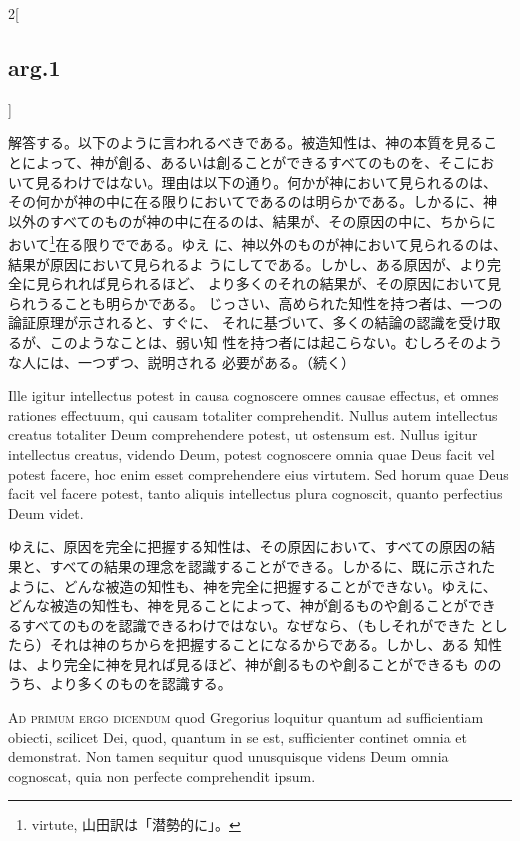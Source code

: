 \documentclass[paper=a4paper,fontsize=10pt,jafontsize=9pt,titlepage]{jlreq}
\begin{document}
\begin{paracol}{2}[\subsection{arg.1}]
\switchcolumn

解答する。以下のように言われるべきである。被造知性は、神の本質を見るこ
とによって、神が創る、あるいは創ることができるすべてのものを、そこにお
いて見るわけではない。理由は以下の通り。何かが神において見られるのは、
その何かが神の中に在る限りにおいてであるのは明らかである。しかるに、神
以外のすべてのものが神の中に在るのは、結果が、その原因の中に、ちからに
おいて\footnote{virtute, 山田訳は「潜勢的に」。}在る限りでである。ゆえ
に、神以外のものが神において見られるのは、結果が原因において見られるよ
うにしてである。しかし、ある原因が、より完全に見られれば見られるほど、
より多くのそれの結果が、その原因において見られうることも明らかである。
じっさい、高められた知性を持つ者は、一つの論証原理が示されると、すぐに、
それに基づいて、多くの結論の認識を受け取るが、このようなことは、弱い知
性を持つ者には起こらない。むしろそのような人には、一つずつ、説明される
必要がある。（続く）

\switchcolumn*

Ille igitur intellectus potest in causa cognoscere omnes causae
effectus, et omnes rationes effectuum, qui causam totaliter
comprehendit. Nullus autem intellectus creatus totaliter Deum
comprehendere potest, ut ostensum est. Nullus igitur intellectus
creatus, videndo Deum, potest cognoscere omnia quae Deus facit vel
potest facere, hoc enim esset comprehendere eius virtutem. Sed horum
quae Deus facit vel facere potest, tanto aliquis intellectus plura
cognoscit, quanto perfectius Deum videt.

\switchcolumn

ゆえに、原因を完全に把握する知性は、その原因において、すべての原因の結
果と、すべての結果の理念を認識することができる。しかるに、既に示された
ように、どんな被造の知性も、神を完全に把握することができない。ゆえに、
どんな被造の知性も、神を見ることによって、神が創るものや創ることができ
るすべてのものを認識できるわけではない。なぜなら、（もしそれができた
としたら）それは神のちからを把握することになるからである。しかし、ある
知性は、より完全に神を見れば見るほど、神が創るものや創ることができるも
ののうち、より多くのものを認識する。

\switchcolumn*[\subsection{ad.1}]

{\scshape Ad primum ergo dicendum} quod Gregorius loquitur quantum ad
sufficientiam obiecti, scilicet Dei, quod, quantum in se est,
sufficienter continet omnia et demonstrat. Non tamen sequitur quod
unusquisque videns Deum omnia cognoscat, quia non perfecte
comprehendit ipsum.


\end{paracol}
\end{document}
